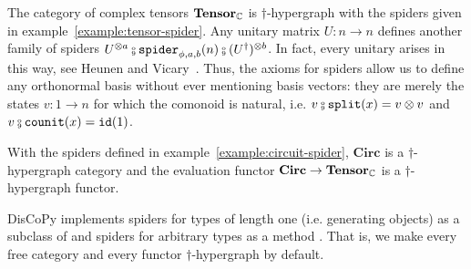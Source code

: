 \begin{example}
The category of complex tensors $\mathbf{Tensor}_{\mathbb{C}}$ is $\dagger$-hypergraph with the spiders given in example~\ref{example:tensor-spider}.
Any unitary matrix $U : n \to n$ defines another family of spiders $U^{\otimes a} \fcmp \spider_{\phi, a, b}(n) \fcmp (U^\dagger)^{\otimes b}$.
In fact, every unitary arises in this way, see Heunen and Vicary~\cite[Corollary 5.32]{HeunenVicary19a}.
Thus, the axioms for spiders allow us to define any orthonormal basis without ever mentioning basis vectors: they are merely the states $v : 1 \to n$ for which the comonoid is natural, i.e. $v \fcmp \ttsplit(x) = v \otimes v$ and $v \fcmp \counit(x) = \id(1)$.
\end{example}

\begin{example}
With the spiders defined in example~\ref{example:circuit-spider}, $\mathbf{Circ}$ is a $\dagger$-hypergraph category and the evaluation functor $\mathbf{Circ} \to \mathbf{Tensor}_{\mathbb{C}}$ is a $\dagger$-hypergraph functor.
\end{example}

DisCoPy implements spiders for types of length one (i.e. generating objects) as a subclass of  and spiders for arbitrary types as a method .
That is, we make every free category and every functor $\dagger$-hypergraph by default.

